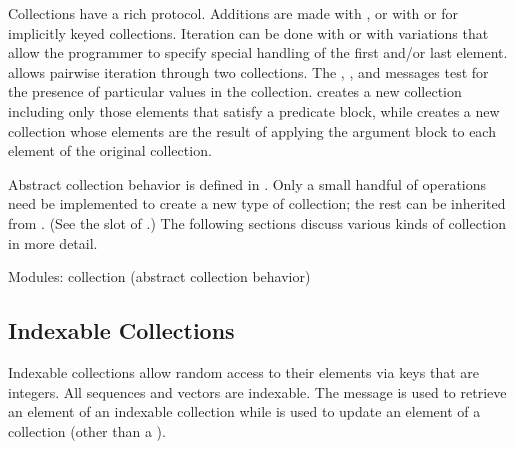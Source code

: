 \documentclass[letterpaper,10pt,english]{sphinxmanual}
\begin{document}
Collections have a rich protocol. Additions are made with , or with  or  for
implicitly keyed collections. Iteration can be done with  or with variations that allow the programmer
to specify special handling of the first and/or last element.  allows pairwise iteration
through two collections. The , , and 
 messages test for the presence of particular values in the collection.
 creates a new collection including only those elements that satisfy a predicate
block, while  creates a new collection whose elements are the result of applying the
argument block to each element of the original collection.

Abstract collection behavior is defined in . Only a small handful of operations need
be implemented to create a new type of collection; the rest can be inherited from .
(See the  slot of .) The following
sections discuss various kinds of collection in more detail.

Modules: collection (abstract collection behavior)


\subsection{Indexable Collections}
\label{\detokenize{collections:indexable-collections}}
\begin{sphinxVerbatim}[commandchars=\\\{\}]
                  
\end{sphinxVerbatim}

Indexable collections allow random access to their elements via keys that are integers. All sequences
and vectors are indexable. The message  is used to retrieve an element of an indexable collection
while  is used to update an element of a  collection (other
than a ).
\end{document}
